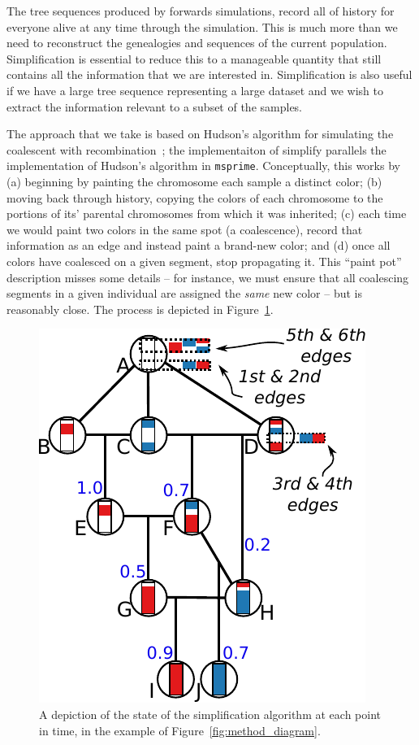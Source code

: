 \documentclass{article}
\newcommand{\msprime}{\texttt{msprime}}
\begin{document}
The tree sequences produced by forwards simulations, 
record all of history for everyone alive at any time through the simulation.
This is much more than we need to reconstruct the genealogies and sequences
of the current population.
Simplification is essential to reduce this 
to a manageable quantity that still contains all
the information that we are interested in. 
Simplification is also useful if we have a
large tree sequence representing a large dataset and we wish to extract the
information relevant to a subset of the samples.

The approach that we take is based on Hudson's algorithm for simulating
the coalescent with recombination~\citep{hudson1983properties,kelleher2016efficient};
the implementaiton of simplify parallels the implementation of Hudson's algorithm in \msprime.
Conceptually, this works by 
(a) beginning by painting the chromosome each sample a distinct color;
(b) moving back through history, 
copying the colors of each chromosome to the portions of its' parental chromosomes
from which it was inherited;
(c) each time we would paint two colors in the same spot (a coalescence),
record that information as an edge and instead paint a brand-new color; 
and
(d) once all colors have coalesced on a given segment,
stop propagating it.
This ``paint pot'' description misses some details --
for instance, we must ensure that all coalescing segments in a given individual
are assigned the \emph{same} new color --
but is reasonably close.
The process is depicted in Figure~\ref{fig:simplify_state}.

\begin{figure}
    \begin{center}
        \includegraphics{simplify-state-diagram}
    \end{center}
    \caption{
        A depiction of the state of the simplification algorithm
        at each point in time,
        in the example of Figure~\ref{fig:method_diagram}.
        \label{fig:simplify_state}
    }
\end{figure}
\end{document}
